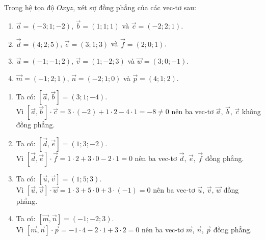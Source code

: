 \begin{bt}%
	Trong hệ tọa độ $Oxyz$, xét sự đồng phẳng của các vec-tơ sau:
	\begin{enumerate}
		\item $\overrightarrow{a} = (-3;1;-2)$, $\overrightarrow{b} = (1;1;1)$ và $\overrightarrow{c} = (-2;2;1)$.
		\item $\overrightarrow{d} = (4;2;5)$, $\overrightarrow{e} = (3;1;3)$ và $\overrightarrow{f} = (2;0;1)$.
		\item $\overrightarrow{u} = (-1;-1;2)$, $\overrightarrow{v} = (1;-2;3)$ và $\overrightarrow{w} = (3;0;-1)$.
		\item $\overrightarrow{m} = (-1;2;1)$, $\overrightarrow{n} = (-2;1;0)$ và $\overrightarrow{p} = (4;1;2)$.
	\end{enumerate}
	\loigiai
	{
		\begin{enumerate}
			\item Ta có: $\left[ \overrightarrow{a}, \overrightarrow{b} \right] = (3;1;-4)$.\\
			Vì $\left[ \overrightarrow{a}, \overrightarrow{b} \right] \cdot \overrightarrow{c} = 3 \cdot (-2) + 1 \cdot 2 - 4 \cdot 1 = -8 \neq 0$ nên ba vec-tơ $\overrightarrow{a}$, $\overrightarrow{b}$, $\overrightarrow{c}$ không đồng phẳng.
			
			\item Ta có: $\left[ \overrightarrow{d}, \overrightarrow{e} \right] = (1;3;-2)$.\\
			Vì $\left[ \overrightarrow{d}, \overrightarrow{e} \right] \cdot \overrightarrow{f} = 1 \cdot 2 + 3 \cdot 0 - 2 \cdot 1 = 0$ nên ba vec-tơ $\overrightarrow{d}$, $\overrightarrow{e}$, $\overrightarrow{f}$  đồng phẳng.
			
			\item Ta có: $\left[ \overrightarrow{u}, \overrightarrow{v} \right] = (1;5;3)$.\\
			Vì $\left[ \overrightarrow{u}, \overrightarrow{v} \right] \cdot \overrightarrow{w} = 1 \cdot 3 + 5 \cdot 0 + 3 \cdot (-1) = 0$ nên ba vec-tơ $\overrightarrow{u}$, $\overrightarrow{v}$, $\overrightarrow{w}$  đồng phẳng.
			
			\item Ta có: $\left[ \overrightarrow{m}, \overrightarrow{n} \right] = (-1;-2;3)$.\\
			Vì $\left[ \overrightarrow{m}, \overrightarrow{n} \right] \cdot \overrightarrow{p} = -1 \cdot 4 - 2 \cdot 1 + 3 \cdot 2 = 0$ nên ba vec-tơ $\overrightarrow{m}$, $\overrightarrow{n}$, $\overrightarrow{p}$  đồng phẳng.
		\end{enumerate}
	}
\end{bt}


